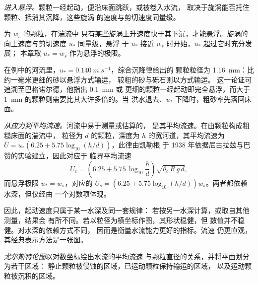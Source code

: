 \emph{进入悬浮。}颗粒一经起动，便沿床面跳跃，或被卷入水流，
取决于旋涡能否托住颗粒、抵消其沉降，这些旋涡
的速度与剪切速度同量级。

\begin{proposition}[悬浮判据]\label{prop:b1:erosion-transport:suspension}
为 $w_s$ 的颗粒，在湍流中
只有某些旋涡上升速度快于其下沉，才能悬浮。旋涡的
向上速度与剪切速度 $u_*$ 同量级，悬浮
于 $u_*$ 接近 $w_s$ 时开始，$u_*$ 超过它时充分发展；
本章取 $u_* = w_s$ 作为悬浮的极限。
\end{proposition}
\admitted

在例中的河流里，$u_* = \qty{0.140}{m.s^{-1}}$，综合沉降律给出的
颗粒粒径为 \qty{1.16}{mm}：比约一毫米更细的砂以悬浮方式输运，
较粗的砂与砾石则以方式输运。
这一论证可追溯至巴格诺尔德，他指出 \qty{0.1}{mm} 或
更细的颗粒一经起动即完全悬浮，而大于
\qty{1}{mm} 的颗粒则需要比其大许多倍的。当
洪水退去、$u_*$ 下降时，粗砂率先落回床面。

\emph{从应力到平均流速。}河流中易于测量或估算的，
是其平均流速。在由颗粒构成粗糙床面的湍流中，
粒径为 $d$ 的颗粒，深度为 $h$ 的宽河道，其平均流速为
$U = u_*\left(6.25 + 5.75\log_{10}(h/d)\right)$，此律由凯勒根
于 1938 年依据尼古拉兹与巴赞的实验建立，因此对应于
临界平均流速
\[
  U_c = \left(6.25 + 5.75\,\log_{10}\frac{h}{d}\right)\sqrt{\theta_c\,R\,g\,d},
\]
而悬浮极限 $u_* = w_s$，对应的 $U_s = \left(6.25 +
5.75\log_{10}(h/d)\right) w_s$。两者都依赖水深，但仅经由
一个对数项体现。

因此，起动速度只属于某一水深及同一套规律：
若按另一水深计算，或取自其他测量，结果会
有所不同。若以粒径为横坐标作图，其形状稳健，但
数值并不稳健。对水深的依赖方式不同，
因而是衡量水流能力更好的指标。流速
仍更直观，其经典表示方法是一张图。

\begin{definition}[尤尔斯特伦图]\label{def:b1:erosion-transport:hjulstrom}
\emph{尤尔斯特伦图}以对数坐标绘出水流的平均流速
与颗粒直径的关系，并将平面划分为若干区域：
静止颗粒被侵蚀的区域，已运动颗粒保持输运的区域，
以及运动颗粒被沉积的区域。
\end{definition}

